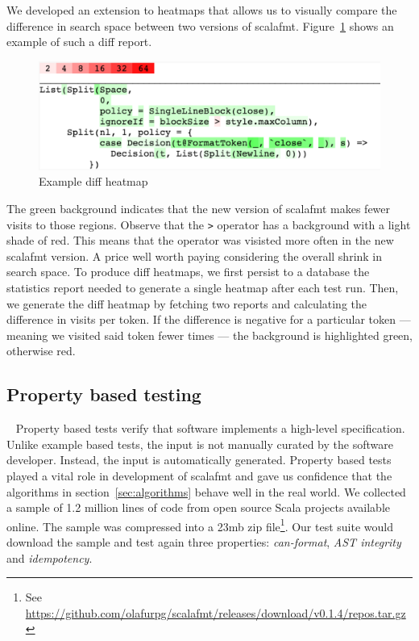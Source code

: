 We developed an extension to heatmaps that allows us to visually compare the difference in search space between two versions of scalafmt.
Figure~\ref{fig:heatmap2} shows an example of such a diff report.
\begin{figure}
  \centering
  \includegraphics[width=\textwidth]{img/heatmap2.png}
  \caption{Example diff heatmap}
  \label{fig:heatmap2}
\end{figure}
The green background indicates that the new version of scalafmt makes fewer visits to those regions.
Observe that the \texttt{>} operator has a background with a light shade of red.
This means that the operator was visisted more often in the new scalafmt version.
A price well worth paying considering the overall shrink in search space.
To produce diff heatmaps, we first persist to a database the statistics report needed to generate a single heatmap after each test run.
Then, we generate the diff heatmap by fetching two reports and calculating the difference in visits per token.
If the difference is negative for a particular token --- meaning we visited said token fewer times --- the background is highlighted green, otherwise red.

\subsection{Property based testing}~\label{sec:testing}
Property based tests verify that software implements a high-level specification.
Unlike example based tests, the input is not manually curated by the software developer.
Instead, the input is automatically generated.
Property based tests played a vital role in development of scalafmt and gave us confidence that the algorithms in section~\ref{sec:algorithms} behave well in the real world.
We collected a sample of 1.2 million lines of code from open source Scala projects available online.
The sample was compressed into a 23mb zip file\footnote{See \url{https://github.com/olafurpg/scalafmt/releases/download/v0.1.4/repos.tar.gz}}.
Our test suite would download the sample and test again three properties: \emph{can-format}, \emph{AST integrity} and \emph{idempotency}.

